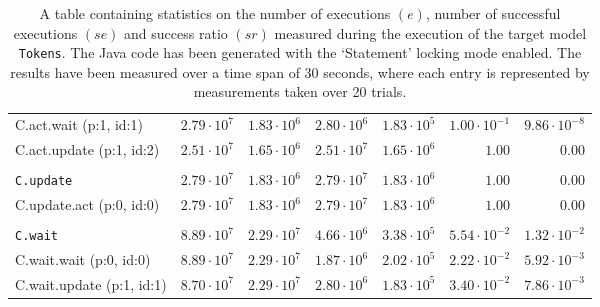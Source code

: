 \begin{table}[htbp]
{\begin{tabular}{lrrrrrr}
\hspace{3mm}C.act.wait (p:1, id:1)    & $2.79 \cdot 10^{7}$ & $1.83 \cdot 10^{6}$ & $2.80 \cdot 10^{6}$ & $1.83 \cdot 10^{5}$ & $1.00 \cdot 10^{-1}$ & $9.86 \cdot 10^{-8}$ \\
\hspace{3mm}C.act.update (p:1, id:2)  & $2.51 \cdot 10^{7}$ & $1.65 \cdot 10^{6}$ & $2.51 \cdot 10^{7}$ & $1.65 \cdot 10^{6}$ &               $1.00$ &               $0.00$ \\
\\[-8pt]\texttt{C.update}             & $2.79 \cdot 10^{7}$ & $1.83 \cdot 10^{6}$ & $2.79 \cdot 10^{7}$ & $1.83 \cdot 10^{6}$ &               $1.00$ &               $0.00$ \\
\hspace{3mm}C.update.act (p:0, id:0)  & $2.79 \cdot 10^{7}$ & $1.83 \cdot 10^{6}$ & $2.79 \cdot 10^{7}$ & $1.83 \cdot 10^{6}$ &               $1.00$ &               $0.00$ \\
\\[-8pt]\texttt{C.wait}               & $8.89 \cdot 10^{7}$ & $2.29 \cdot 10^{7}$ & $4.66 \cdot 10^{6}$ & $3.38 \cdot 10^{5}$ & $5.54 \cdot 10^{-2}$ & $1.32 \cdot 10^{-2}$ \\
\hspace{3mm}C.wait.wait (p:0, id:0)   & $8.89 \cdot 10^{7}$ & $2.29 \cdot 10^{7}$ & $1.87 \cdot 10^{6}$ & $2.02 \cdot 10^{5}$ & $2.22 \cdot 10^{-2}$ & $5.92 \cdot 10^{-3}$ \\
\hspace{3mm}C.wait.update (p:1, id:1) & $8.70 \cdot 10^{7}$ & $2.29 \cdot 10^{7}$ & $2.80 \cdot 10^{6}$ & $1.83 \cdot 10^{5}$ & $3.40 \cdot 10^{-2}$ & $7.86 \cdot 10^{-3}$ \\
\bottomrule
\end{tabular}
}
\caption{A table containing statistics on the number of executions $(e)$, number of successful executions $(se)$ and success ratio $(sr)$ measured during the execution of the target model \texttt{Tokens}. The Java code has been generated with the `Statement' locking mode enabled. The results have been measured over a time span of 30 seconds, where each entry is represented by measurements taken over 20 trials.}
\label{table:frequency_results_tokens_statement}
\end{table}